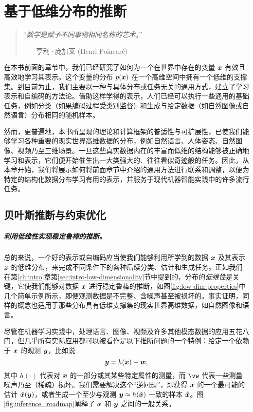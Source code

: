 \documentclass[../../book-main_zh.tex]{subfiles}
\begin{document}
\chapter{基于低维分布的推断}
\label{ch:conditional-inference}

\begin{quote}

\hfill    “{\em 数学是赋予不同事物相同名称的艺术}。”

$~$ \hfill --- 亨利·庞加莱 (Henri Poincar\'e)
\end{quote}
\vspace{5mm}


在本书前面的章节中，我们已经研究了如何为一个在世界中存在的变量 $\bm{x}$ 有效且高效地学习其表示。这个变量的分布 $p(\bm{x})$ 在一个高维空间中拥有一个低维的支撑集。到目前为止，我们主要以一种与具体分布或任务无关的通用方式，建立了学习表示和自编码的方法论。借助这样学得的表示，人们已经可以执行一些通用的基础任务，例如分类（如果编码过程受类别监督）和生成与给定数据（如自然图像或自然语言）分布相同的随机样本。

然而，更普遍地，本书所呈现的理论和计算框架的普适性与可扩展性，已使我们能够学习各种重要的现实世界高维数据的分布，例如自然语言、人体姿态、自然图像、视频乃至三维场景。一旦这些真实数据内在的丰富而低维的结构能够被正确地学习和表示，它们便开始催生出一大类强大的、往往看似奇迹般的任务。因此，从本章开始，我们将展示如何将前面章节中介绍的通用方法进行联系和调整，以便为特定的结构化数据分布学习有用的表示，并服务于现代机器智能实践中的许多流行任务。

\section{贝叶斯推断与约束优化}
\paragraph{利用低维性实现稳定鲁棒的推断。}
总的来说，一个好的表示或自编码应当使我们能够利用所学到的数据 $\bm{x}$ 及其表示 $\bm{z}$ 的低维分布，来完成不同条件下的各种后续分类、估计和生成任务。正如我们在第\ref{ch:intro}章第\ref{sec:intro-low-dimensionality}节中提到的，分布的{\em 低维性}是关键，它使我们能够对数据 $\bm{x}$ 进行稳定鲁棒的推断，如图\ref{fig:low-dim-properties}中几个简单示例所示，即便观测数据是不完整、含噪声甚至被损坏的。事实证明，同样的概念也适用于那些分布具有低维支撑集的现实世界高维数据，如自然图像和语言。

尽管在机器学习实践中，处理语言、图像、视频及许多其他模态数据的应用五花八门，但几乎所有实际应用都可以被看作是以下推断问题的一个特例：给定一个依赖于 $\bm{x}$ 的观测 $\bm{y}$，比如说
\begin{equation}
    \bm{y} = h(\bm{x}) + \boldsymbol{w},
\end{equation}
其中 $h(\cdot)$ 代表对 $\bm{x}$ 的一部分或其某些特定属性的测量，而 $\vw$ 代表一些测量噪声乃至（稀疏）损坏。我们需要解决这个“逆问题”，即获得 $\bm{x}$ 的一个最可能的估计 $\hat {\bm{x}}(\bm{y})$，或者生成一个至少与观测 $\bm{y} \approx h(\hat{\bm{x}})$ 一致的样本 $\hat{\bm{x}}$。图\ref{fig:inference_roadmap}阐释了 $\bm{x}$ 和 $\bm{y}$ 之间的一般关系。
\end{document}
